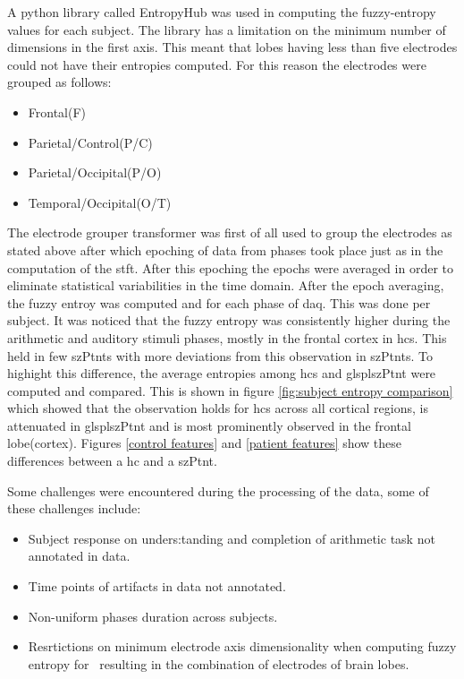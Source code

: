 \documentclass[10pt]{article}
\begin{document}
A python library called EntropyHub was used in computing the fuzzy-entropy values for each subject. 
The library has a limitation on the minimum number of dimensions in the first axis. This meant that lobes having less 
than five electrodes could not have their entropies computed. For this reason the electrodes were grouped as follows:
\begin{itemize}
  \item Frontal(F)
  \item Parietal/Control(P/C)
  \item Parietal/Occipital(P/O)
  \item Temporal/Occipital(O/T)
\end{itemize}
The electrode grouper transformer was first of all used to group the electrodes as stated above after 
which epoching of data from phases took place just as in the computation of the \gls{stft}. After 
this epoching the epochs were averaged in order to eliminate statistical variabilities in the time domain. 
After the epoch averaging, the fuzzy entroy was computed and for each phase of \gls{daq}. This was 
done per subject. It was noticed that the fuzzy entropy was consistently higher during the arithmetic and 
auditory stimuli phases, mostly in the frontal cortex in \glspl{hc}. This held in few \glspl{szPtnt} with more 
deviations from this observation in \glspl{szPtnt}. To highight this difference, the average entropies among 
\glspl{hc} and glspl{szPtnt} were computed and compared. This is shown in figure \ref{fig:subject entropy comparison} 
which showed that the observation holds for \glspl{hc} across all cortical regions, is attenuated in glspl{szPtnt} and 
is most prominently observed in the frontal lobe(cortex). Figures \ref{control features} and 
\ref{patient features} show these differences between a \gls{hc} and a \gls{szPtnt}. 

Some challenges were encountered during the processing of the data, some of these challenges include:
  \begin{itemize}
    \item Subject response on unders:tanding and completion of arithmetic task not annotated in data.
    \item Time points of artifacts in data not annotated.
    \item Non-uniform phases duration across subjects.
    \item Resrtictions on minimum electrode axis dimensionality when computing fuzzy entropy for \
    resulting in the combination of electrodes of brain lobes.
  \end{itemize}
\end{document}
